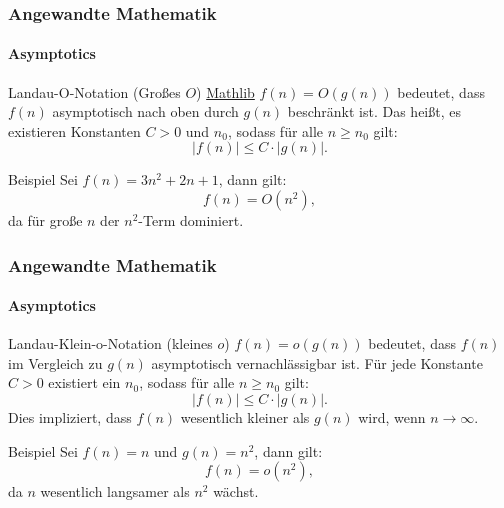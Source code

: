 \documentclass{beamer}
\begin{document}
\begin{frame}
    \frametitle{Angewandte Mathematik}
    \framesubtitle{Asymptotics}
    \begin{block}{Landau-O-Notation (Großes \( O \)) \href{https://github.com/leanprover-community/mathlib4/blob/418a5eb7aec3fb639097cb13f74fc031ac4057f2/Mathlib/Analysis/Asymptotics/Asymptotics.lean\#L75-L80}{Mathlib}
        }
    \( f(n) = O(g(n)) \) bedeutet, dass \( f(n) \) asymptotisch nach oben durch \( g(n) \) beschränkt ist. Das heißt, es existieren Konstanten \( C > 0 \) und \( n_0 \), sodass für alle \( n \geq n_0 \) gilt:
    \[
    |f(n)| \leq C \cdot |g(n)|.
    \]
    \end{block}

    \begin{exampleblock}{Beispiel} 
    Sei \( f(n) = 3n^2 + 2n + 1 \), dann gilt:
    \[
    f(n) = O(n^2),
    \]
    da für große \( n \) der \( n^2 \)-Term dominiert.
    \end{exampleblock}
\end{frame}

\begin{frame}
    \frametitle{Angewandte Mathematik}
    \framesubtitle{Asymptotics}
    
    \begin{block}{Landau-Klein-o-Notation (kleines \( o \))}
        \( f(n) = o(g(n)) \) bedeutet, dass \( f(n) \) im Vergleich zu \( g(n) \) asymptotisch vernachlässigbar ist. Für jede Konstante \( C > 0 \) existiert ein \( n_0 \), sodass für alle \( n \geq n_0 \) gilt:
        \[
        |f(n)| \leq C \cdot |g(n)|.
        \]
        Dies impliziert, dass \( f(n) \) wesentlich kleiner als \( g(n) \) wird, wenn \( n \to \infty \).
    \end{block}

    \begin{exampleblock}{Beispiel}
        Sei \( f(n) = n \) und \( g(n) = n^2 \), dann gilt:
        \[
        f(n) = o(n^2),
        \]
        da \( n \) wesentlich langsamer als \( n^2 \) wächst.
    \end{exampleblock}
\end{frame}
\end{document}
